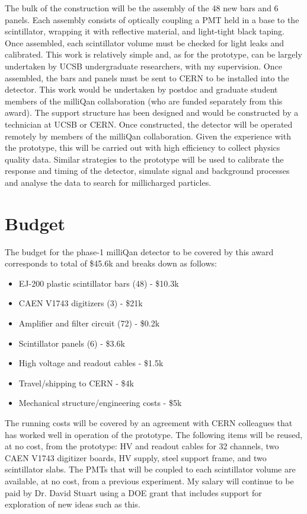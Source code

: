 \documentclass[11pt]{article}
\theoremstyle{plain} \numberwithin{equation}{section}
\theoremstyle{definition}
\begin{document}
The bulk of the construction will be the assembly of the 48 new bars and 6 panels.
Each assembly consists of optically coupling a PMT held in a base
to the scintillator, wrapping it with reflective material, and light-tight black
taping. Once assembled, each scintillator volume must be checked for light leaks and calibrated.
This work is relatively simple and, as for the prototype, can be largely undertaken
by UCSB undergraduate researchers, with my supervision. Once assembled, the bars and panels
must be sent to CERN to be installed into the detector. This work would be 
undertaken by postdoc and graduate student members of the milliQan collaboration 
(who are funded separately from this award). The support structure has been designed and would be 
constructed by a technician at UCSB or CERN. Once constructed, the detector will be operated
remotely by members of the milliQan collaboration. Given the experience with the
prototype, this will be carried out with high efficiency to collect physics quality
data. Similar strategies to the prototype will be used to calibrate the response and timing of the 
detector, simulate signal and background processes and analyse the data to 
search for millicharged particles.

\section*{Budget}

The budget for the phase-1 milliQan detector to be covered by this award corresponds to total of \$45.6k and
breaks down as follows:

\begin{itemize}
    \item EJ-200 plastic scintillator bars (48) - \$10.3k
    \item CAEN V1743 digitizers (3) - \$21k
    \item Amplifier and filter circuit (72)  - \$0.2k
    \item Scintillator panels (6) - \$3.6k
    \item High voltage and readout cables - \$1.5k
    \item Travel/shipping to CERN - \$4k
    \item Mechanical structure/engineering costs - \$5k
\end{itemize}

The running costs will be covered by an agreement with CERN colleagues that has 
worked well in operation of the prototype. The following items will be reused, at no 
cost, from the prototype: HV and readout cables for 32 channels, two CAEN V1743 digitizer boards,
HV supply, steel support frame, and two scintillator slabs. The PMTs that will be coupled to each scintillator volume
are available, at no cost, from a previous experiment. My salary will continue to be paid by Dr. David Stuart 
using a DOE grant that includes support for exploration of new ideas such as this. 
\end{document}
